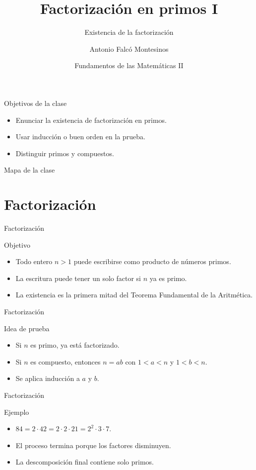 \documentclass[aspectratio=169,11pt]{beamer}
\title[FdM II -- Clase 07]{Factorización en primos I}
\subtitle{Existencia de la factorización}
\author{Antonio Falcó Montesinos}
\institute{Universidad CEU Cardenal Herrera}
\date{Fundamentos de las Matemáticas II}
\begin{document}
\begin{frame}
  \titlepage
\end{frame}

\begin{frame}{Objetivos de la clase}
\begin{itemize}
  \item Enunciar la existencia de factorización en primos.
  \item Usar inducción o buen orden en la prueba.
  \item Distinguir primos y compuestos.
\end{itemize}
\end{frame}

\begin{frame}{Mapa de la clase}
\tableofcontents
\end{frame}

\section{Factorización}

\begin{frame}{Factorización}
\begin{block}{Objetivo}
\begin{itemize}
  \item Todo entero \(n>1\) puede escribirse como producto de números primos.
  \item La escritura puede tener un solo factor si \(n\) ya es primo.
  \item La existencia es la primera mitad del Teorema Fundamental de la Aritmética.
\end{itemize}
\end{block}
\end{frame}

\begin{frame}{Factorización}
\begin{block}{Idea de prueba}
\begin{itemize}
  \item Si \(n\) es primo, ya está factorizado.
  \item Si \(n\) es compuesto, entonces \(n=ab\) con \(1<a<n\) y \(1<b<n\).
  \item Se aplica inducción a \(a\) y \(b\).
\end{itemize}
\end{block}
\end{frame}

\begin{frame}{Factorización}
\begin{block}{Ejemplo}
\begin{itemize}
  \item \(84=2\cdot 42=2\cdot 2\cdot 21=2^2\cdot 3\cdot 7\).
  \item El proceso termina porque los factores disminuyen.
  \item La descomposición final contiene solo primos.
\end{itemize}
\end{block}
\end{frame}
\end{document}
